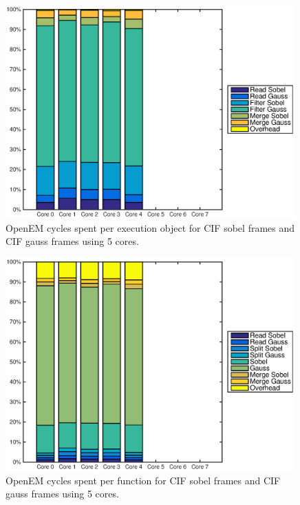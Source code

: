 \begin{figure}[h!]
    \begin{center}
        \includegraphics[width=0.99\textwidth]{images/openem_cifcif_5cores_eo.eps}
        \caption{OpenEM cycles spent per execution object for CIF sobel frames and CIF gauss frames using 5 cores.}
        \label{fig:oem5coreeo}
    \end{center}
\end{figure}

\begin{figure}[h!]
    \begin{center}
        \includegraphics[width=0.99\textwidth]{images/openem_cifcif_5cores_func.eps}
        \caption{OpenEM cycles spent per function for CIF sobel frames and CIF gauss frames using 5 cores.}
        \label{fig:oem5corefunc}
    \end{center}
\end{figure}


